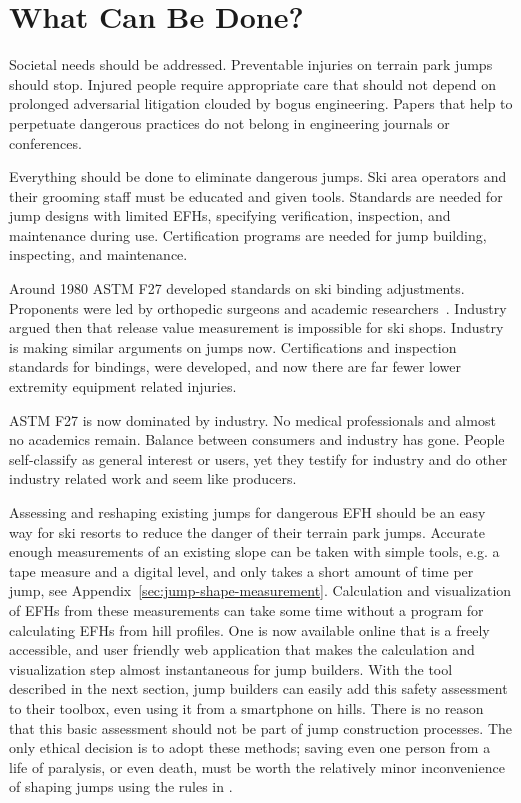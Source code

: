 \documentclass[smallextended]{svjour3}       %
\begin{document}
\section{What Can Be Done?}
\label{sec:action}
%
Societal needs should be addressed. Preventable injuries on terrain park jumps
should stop. Injured people require appropriate care that should not depend on
prolonged adversarial litigation clouded by bogus engineering. Papers that help
to perpetuate dangerous practices do not belong in engineering journals or
conferences.

Everything should be done to eliminate dangerous jumps.  Ski area operators and
their grooming staff must be educated and given tools. Standards are needed for
jump designs with limited EFHs, specifying verification, inspection, and
maintenance during use. Certification programs are needed for jump building,
inspecting, and maintenance.

Around 1980 ASTM F27 developed standards on ski binding adjustments. Proponents
were led by orthopedic surgeons and academic researchers~\cite{Bahniuk1996}.
Industry argued then that release value measurement is impossible for ski
shops. Industry is making similar arguments on jumps now. Certifications and
inspection standards for bindings, were developed, and now there are far fewer
lower extremity equipment related injuries.

ASTM F27 is now dominated by industry. No medical professionals and almost no
academics remain. Balance between consumers and industry has gone.  People
self-classify as general interest or users, yet they testify for industry and
do other industry related work and seem like producers.

Assessing and reshaping existing jumps for dangerous EFH should be an easy way
for ski resorts to reduce the danger of their terrain park jumps. Accurate
enough measurements of an existing slope can be taken with simple tools, e.g. a
tape measure and a digital level, and only takes a short amount of time per
jump, see Appendix~\ref{sec:jump-shape-measurement}.  Calculation and
visualization of EFHs  from these measurements can take some time without a
program for calculating EFHs from hill profiles. One is now available online
that is a freely accessible, and user friendly web application that makes the
calculation and visualization step almost instantaneous for jump builders. With
the tool described in the next section, jump builders can easily add this
safety assessment to their toolbox, even using it from a smartphone on hills.
There is no reason that this basic assessment should not be part of jump
construction processes. The only ethical decision is to adopt these methods;
saving even one person from a life of paralysis, or even death, must be worth
the relatively minor inconvenience of shaping jumps using the rules in
\cite{Levy2015}.
\end{document}
